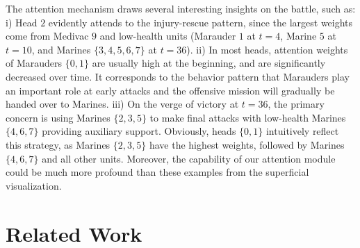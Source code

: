 \documentclass{article} %
\begin{document}
The attention mechanism draws several interesting insights on the battle, such as: i) Head $2$ evidently attends to the injury-rescue pattern, since the largest weights come from Medivac $9$ and low-health units (Marauder $1$ at $t\!=\!4$, Marine $5$ at $t\!=\!10$, and Marines $\{3,4,5,6,7\}$ at $t\!=\!36$). 
ii) In most heads, attention weights of Marauders $\{0,1\}$ are usually high at the beginning, and are significantly decreased over time. It corresponds to the behavior pattern that Marauders play an important role at early attacks and the offensive mission will gradually be handed over to Marines.
iii) On the verge of victory at $t\!=\!36$, the primary concern is using Marines $\{2,3,5\}$ to make final attacks with low-health Marines $\{4,6,7\}$ providing auxiliary support. Obviously, heads $\{0,1\}$ intuitively reflect this strategy, as Marines $\{2,3,5\}$ have the highest weights, followed by Marines $\{4,6,7\}$ and all other units.
Moreover, the capability of our attention module could be much more profound than these examples from the superficial visualization. 





\section{Related Work}
\end{document}
